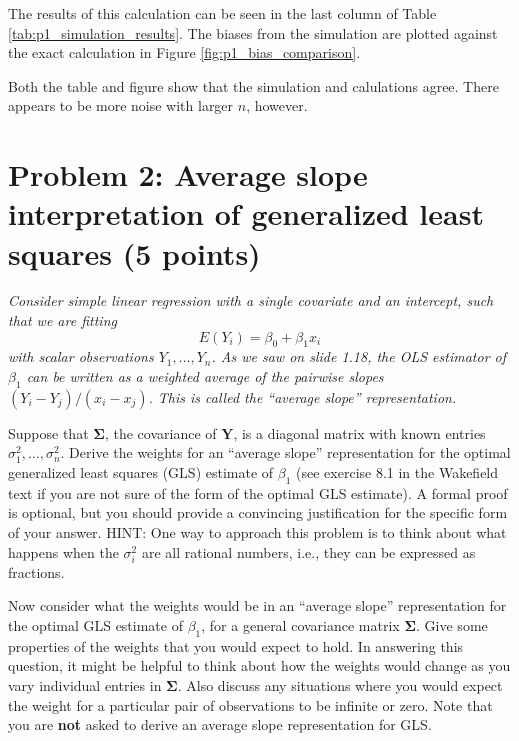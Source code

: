 \documentclass[11pt, letterpaper]{article}
\newcommand{\bY}{{\bm Y}}
\newcommand{\bSigma}{{\bm \Sigma}}
\begin{document}
{\begin{enumerate}[(a)]
\begin{description}
  The results of this calculation can be seen in the last column of Table
  \ref{tab:p1_simulation_results}. The biases from the simulation are plotted
  against the exact calculation in Figure \ref{fig:p1_bias_comparison}.

  Both the table and figure show that the simulation and calulations
  agree. There appears to be more noise with larger $n$, however.
\end{description}
\end{enumerate}



\section*{Problem 2: Average slope interpretation of generalized least squares (5 points)}
{\em Consider simple linear regression with a
single covariate and an intercept, such that we are fitting
\[
E(Y_i)=\beta_0 + \beta_1 x_i
\]
with scalar observations $Y_1,\ldots,Y_n$. As we saw on slide 1.18, the OLS estimator of $\beta_1$ can
be written as a weighted average of the pairwise slopes $(Y_i-Y_j)/(x_i-x_j)$.
This is called the ``average slope'' representation.
}
\begin{enumerate}[(a)]
{\em \item Suppose that $\bSigma$, the covariance of $\bY$, is a diagonal matrix with known entries $\sigma_1^2,\ldots,\sigma_n^2$.
Derive the weights for an ``average slope'' representation for the optimal generalized least squares (GLS) estimate of $\beta_1$ (see exercise 8.1 in the Wakefield text if you are not sure of the form of the optimal GLS estimate).  A formal proof is optional, but you should provide a convincing justification for the specific form of your answer.  HINT: One way to approach this problem is to think about what happens when the $\sigma^2_i$ are all rational numbers, i.e., they can be expressed as fractions.}
{\item Now consider what the weights would be in an ``average slope''
representation for the optimal GLS estimate of $\beta_1$, for a general covariance matrix $\bSigma$.  Give some properties of the weights that you would expect to hold.  In answering this question, it might be helpful to think about how the weights would change as you vary individual entries in $\bSigma$.
Also discuss any situations where you would expect the weight for a particular pair of observations to 
be infinite or zero.  Note that you are {\bf not} asked to derive an average slope representation for GLS.}
\end{enumerate} 


}
\end{document}
